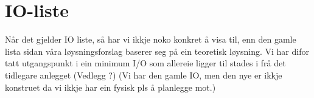 \section{IO-liste}
\thispagestyle{fancy}

Når det gjelder \gls{IO} liste, så har vi ikkje noko konkret å visa til, enn den gamle lista sidan våra løysningsforslag baserer seg på ein teoretisk løysning.
Vi har difor tatt utgangspunkt i ein minimum I/O som allereie ligger til stades i frå det tidlegare anlegget (Vedlegg ?) 
(Vi har den gamle IO, men den nye er ikkje konstruet da vi ikkje har ein fysisk pls å planlegge mot.)

%
%




